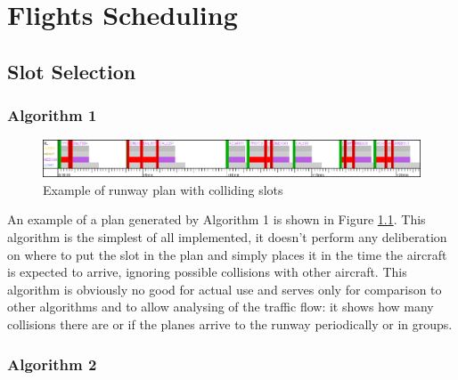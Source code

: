 
\chapter{Flights Scheduling}


\section{Slot Selection}

\subsection{Algorithm 1}

\begin{figure}[h]
    \centering
    \includegraphics[width=\textwidth]{figures/rwy-in-place.png}
    \caption{Example of runway plan with colliding slots}
    \label{fig:rwy-in-place}
\end{figure}

An example of a plan generated by Algorithm 1 is shown in Figure \ref{fig:rwy-in-place}. This algorithm is the simplest of all implemented, it doesn't perform any deliberation on where to put the slot in the plan and simply places it in the time the aircraft is expected to arrive, ignoring possible collisions with other aircraft. This algorithm is obviously no good for actual use and serves only for comparison to other algorithms and to allow analysing of the traffic flow: it shows how many collisions there are or if the planes arrive to the runway periodically or in groups.

\subsection{Algorithm 2}

